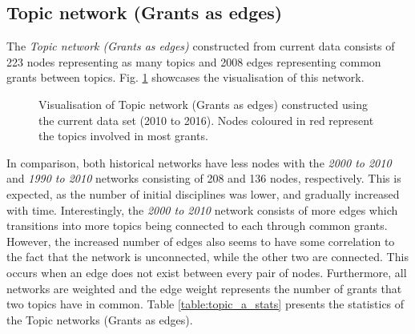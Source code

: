 \subsection{Topic network (Grants as edges)}

The \textit{Topic network (Grants as edges)} constructed from current data consists of 223 nodes representing as many topics and 2008 edges representing common grants between topics. Fig. \ref{fig:topic_a_vis} showcases the visualisation of this network.

\begin{figure}[htpb]
    \centering
    \caption[Visualisation of Topic network (Grants as edges) constructed using the current data set (2010 to 2016)]{Visualisation of Topic network (Grants as edges) constructed using the current data set (2010 to 2016). Nodes coloured in red represent the topics involved in most grants.}
    \label{fig:topic_a_vis}
\end{figure}

In comparison, both historical networks have less nodes with the \textit{2000 to 2010} and \textit{1990 to 2010} networks consisting of 208 and 136 nodes, respectively. This is expected, as the number of initial disciplines was lower, and gradually increased with time. Interestingly, the \textit{2000 to 2010} network consists of more edges which transitions into more topics being connected to each through common grants. However, the increased number of edges also seems to have some correlation to the fact that the network is unconnected, while the other two are connected. This occurs when an edge does not exist between every pair of nodes. Furthermore, all networks are weighted and the edge weight represents the number of grants that two topics have in common. Table \ref{table:topic_a_stats} presents the statistics of the Topic networks (Grants as edges).

